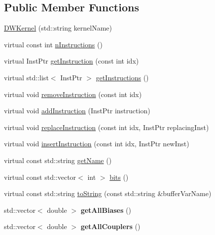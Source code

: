\subsection*{Public Member Functions}
\begin{DoxyCompactItemize}
\item 
\hyperlink{a00045_a76a4dfadb973abbc93d1afefc6839ad8}{D\+W\+Kernel} (std\+::string kernel\+Name)
\item 
virtual const int \hyperlink{a00045_a79aecc7419a20b8779372ef36fc24806}{n\+Instructions} ()
\item 
virtual Inst\+Ptr \hyperlink{a00045_a00f23cd2e15ea6b9d00d4f3dbe1540f8}{get\+Instruction} (const int idx)
\item 
virtual std\+::list$<$ Inst\+Ptr $>$ \hyperlink{a00045_abbb8f2b1c78623c377524e45d581d018}{get\+Instructions} ()
\item 
virtual void \hyperlink{a00045_af2bcfd679e6cb89194f3f0bff8622b99}{remove\+Instruction} (const int idx)
\item 
virtual void \hyperlink{a00045_a4c3043d6971999c3a09e797fc55deb6c}{add\+Instruction} (Inst\+Ptr instruction)
\item 
virtual void \hyperlink{a00045_a75eb3560d2f81c9a5ae1cf765deb0e83}{replace\+Instruction} (const int idx, Inst\+Ptr replacing\+Inst)
\item 
virtual void \hyperlink{a00045_a1627af0141f70fc4a3cd500a13fb31b8}{insert\+Instruction} (const int idx, Inst\+Ptr new\+Inst)
\item 
virtual const std\+::string \hyperlink{a00045_a7f0c4d3c73029566561cf56a474bcbbd}{get\+Name} ()
\item 
virtual const std\+::vector$<$ int $>$ \hyperlink{a00045_adae68964db6acd8b4c2267c270a8ec58}{bits} ()
\item 
virtual const std\+::string \hyperlink{a00045_adbc3fdd080ebba20bc620b8832979f16}{to\+String} (const std\+::string \&buffer\+Var\+Name)
\item 
std\+::vector$<$ double $>$ {\bfseries get\+All\+Biases} ()\hypertarget{a00045_a9ee05b3d7689bbf837bdb7737f9745f4}{}\label{a00045_a9ee05b3d7689bbf837bdb7737f9745f4}

\item 
std\+::vector$<$ double $>$ {\bfseries get\+All\+Couplers} ()\hypertarget{a00045_a7df03ecec9c1821433daa3aa092cbd4d}{}\label{a00045_a7df03ecec9c1821433daa3aa092cbd4d}


\end{DoxyCompactItemize}
